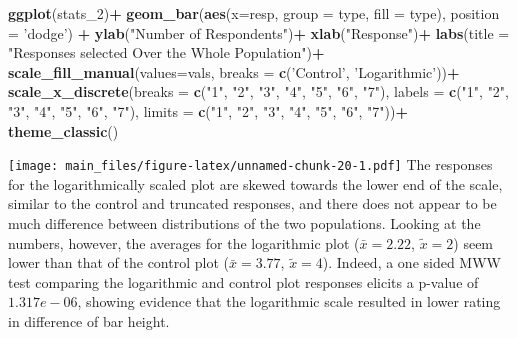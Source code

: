 \documentclass[
]{article}
\newenvironment{Shaded}{\begin{snugshade}}{\end{snugshade}}
\newcommand{\DataTypeTok}[1]{\textcolor[rgb]{0.13,0.29,0.53}{#1}}
\newcommand{\DecValTok}[1]{\textcolor[rgb]{0.00,0.00,0.81}{#1}}
\newcommand{\KeywordTok}[1]{\textcolor[rgb]{0.13,0.29,0.53}{\textbf{#1}}}
\newcommand{\NormalTok}[1]{#1}
\newcommand{\OperatorTok}[1]{\textcolor[rgb]{0.81,0.36,0.00}{\textbf{#1}}}
\newcommand{\StringTok}[1]{\textcolor[rgb]{0.31,0.60,0.02}{#1}}
\begin{document}
\begin{Shaded}
\begin{Highlighting}[]
\KeywordTok{ggplot}\NormalTok{(stats_}\DecValTok{2}\NormalTok{)}\OperatorTok{+}
\StringTok{  }\KeywordTok{geom_bar}\NormalTok{(}\KeywordTok{aes}\NormalTok{(}\DataTypeTok{x=}\NormalTok{resp, }\DataTypeTok{group =}\NormalTok{ type, }\DataTypeTok{fill =}\NormalTok{ type), }\DataTypeTok{position =} \StringTok{'dodge'}\NormalTok{) }\OperatorTok{+}
\StringTok{  }\KeywordTok{ylab}\NormalTok{(}\StringTok{"Number of Respondents"}\NormalTok{)}\OperatorTok{+}
\StringTok{  }\KeywordTok{xlab}\NormalTok{(}\StringTok{"Response"}\NormalTok{)}\OperatorTok{+}
\StringTok{  }\KeywordTok{labs}\NormalTok{(}\DataTypeTok{title =} \StringTok{"Responses selected Over the Whole Population"}\NormalTok{)}\OperatorTok{+}
\StringTok{  }\KeywordTok{scale_fill_manual}\NormalTok{(}\DataTypeTok{values=}\NormalTok{vals, }\DataTypeTok{breaks =} \KeywordTok{c}\NormalTok{(}\StringTok{'Control'}\NormalTok{, }\StringTok{'Logarithmic'}\NormalTok{))}\OperatorTok{+}
\StringTok{  }\KeywordTok{scale_x_discrete}\NormalTok{(}\DataTypeTok{breaks =} \KeywordTok{c}\NormalTok{(}\StringTok{"1"}\NormalTok{, }\StringTok{"2"}\NormalTok{, }\StringTok{"3"}\NormalTok{, }\StringTok{"4"}\NormalTok{, }\StringTok{"5"}\NormalTok{, }\StringTok{"6"}\NormalTok{, }\StringTok{"7"}\NormalTok{), }\DataTypeTok{labels =} \KeywordTok{c}\NormalTok{(}\StringTok{"1"}\NormalTok{, }\StringTok{"2"}\NormalTok{, }\StringTok{"3"}\NormalTok{, }\StringTok{"4"}\NormalTok{, }\StringTok{"5"}\NormalTok{, }\StringTok{"6"}\NormalTok{, }\StringTok{"7"}\NormalTok{), }\DataTypeTok{limits =} \KeywordTok{c}\NormalTok{(}\StringTok{"1"}\NormalTok{, }\StringTok{"2"}\NormalTok{, }\StringTok{"3"}\NormalTok{, }\StringTok{"4"}\NormalTok{, }\StringTok{"5"}\NormalTok{, }\StringTok{"6"}\NormalTok{, }\StringTok{"7"}\NormalTok{))}\OperatorTok{+}
\StringTok{  }\KeywordTok{theme_classic}\NormalTok{()}
\end{Highlighting}
\end{Shaded}

\texttt{[image: main\_files/figure-latex/unnamed-chunk-20-1.pdf]} The
responses for the logarithmically scaled plot are skewed towards the
lower end of the scale, similar to the control and truncated responses,
and there does not appear to be much difference between distributions of
the two populations. Looking at the numbers, however, the averages for
the logarithmic plot (\(\bar{x}=2.22\), \(\tilde{x}=2\)) seem lower than
that of the control plot (\(\bar{x}=3.77\), \(\tilde{x}=4\)). Indeed, a
one sided MWW test comparing the logarithmic and control plot responses
elicits a p-value of \(1.317e-06\), showing evidence that the
logarithmic scale resulted in lower rating in difference of bar height.
\end{document}
